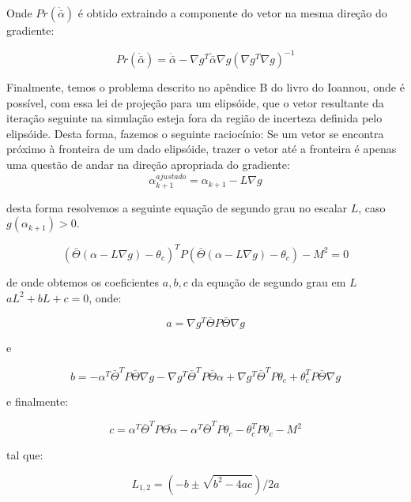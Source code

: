 \documentclass[11pt]{report}
\begin{document}
Onde $Pr(\dot{\bar{\alpha}})$ é obtido extraindo a componente do vetor na mesma direção do gradiente:

\begin{equation}
Pr(\dot{\bar{\alpha}}) = \dot{\bar{\alpha}} - \nabla g^T \dot{\bar{\alpha}} \nabla g (\nabla g^T \nabla g)^{-1}
\end{equation}

Finalmente, temos o problema descrito no apêndice B do livro do Ioannou, onde é possível, com essa lei de projeção para um elipsóide, que o vetor resultante da iteração seguinte na simulação esteja fora da região de incerteza definida pelo elipsóide. Desta forma, fazemos o seguinte raciocínio: Se um vetor se encontra próximo à fronteira de um dado elipsóide, trazer o vetor até a fronteira é apenas uma questão de andar na direção apropriada do gradiente: 
\begin{equation}
\alpha_{k+1}^{ajustado} = \alpha_{k+1} - L\nabla g
\end{equation}


desta forma resolvemos a seguinte equação de segundo grau no escalar $L$, caso $g(\alpha_{k+1})>0$.

\begin{equation}
(\bar{\Theta}(\alpha - L\nabla g) - \theta_c)^TP(\bar{\Theta}(\alpha - L\nabla g) - \theta_c) - M^2 = 0
\end{equation}

de onde obtemos os coeficientes $a,b,c$ da equação de segundo grau em $L$\\
$aL^2 +bL + c = 0$, onde:

\begin{equation}
a = \nabla g^T \bar{\Theta} P \bar{\Theta} \nabla g
\end{equation}

e
 
\begin{equation}
b = -\alpha^T \bar{\Theta}^T P \bar{\Theta} \nabla g - \nabla g^T\bar{\Theta}^TP\bar{\Theta}\alpha + \nabla g^T \bar{\Theta}^T P \theta_c + \theta_c^TP\bar{\Theta}\nabla g
\end{equation}

e finalmente:

\begin{equation}
c = \alpha^T \bar{\Theta}^T P \bar{\Theta \alpha} - \alpha^T \bar{\Theta}^TP\theta_c - \theta_c^TP\theta_c - M^2
\end{equation}

tal que:

\begin{equation}
L_{1,2} = (-b \pm \sqrt{b^2 - 4ac})/2a
\end{equation}
\end{document}
